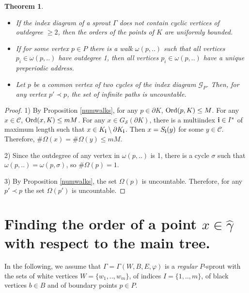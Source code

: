 \documentclass[11pt,reqno]{amsart}
\newtheorem{theorem}{Theorem}[section]
\newcommand{\hga}{{\hat\gamma}}
\newcommand{\eS}{{\mathcal S}}
\begin{document}
\begin{theorem}\label{inf_ram}
\qquad
\begin{itemize} 
\item[1)] If the index diagram of a sprout $\Gamma$ does not contain cyclic  vertices of outdegree $\ge 2$,
then the  orders of the points of $K$ are uniformly bounded.
\item[2)] If for some vertex $p \in  P $ there is a walk $\omega(p,..)$ such that all  vertices $p_i\in \omega(p,..)$ have  outdegree 1, then all  vertices $p_i\in \omega(p,..)$ have a unique preperiodic address.
\item[3)] Let $p$ be a common vertex of  two cycles  of the index diagram ${{\mathcal G}}_P$. Then, for any vertex $p'\prec p$, the set of infinite paths is uncountable.
\end{itemize}
\end{theorem}
  
\begin{proof} 
1) By Proposition \ref{numwalks},  for any $p\in {\partial} K$, ${\mathop{\rm Ord} \nolimits}(p,K)\le M$.
For any $x\in {\mathcal C}$, ${\mathop{\rm Ord} \nolimits}(x,K)\le m M$.
For any $x\in G_{\eS}({\partial} K)$, there is a multiindex ${\bf {i}}\in  I^*$ of maximum length such that  $x\in K_{\bf {i}}\setminus {\partial} K_{\bf {i}}$. Then $x=S_{\bf {i}}(y)$ for some 
$y\in{\mathcal C}$. Therefore, $\#\Omega(x)=\#\Omega(y) \le mM$. 

2) Since the outdegree of any vertex in $\omega(p,..)$ is 1, there is a cycle $\sigma$ such that $\omega(p,..)=\omega(p,\sigma)$, so $\#\Omega(p)=1$.

3) By Proposition \ref{numwalks},  the set $\Omega(p)$ is uncountable. 
Therefore, for any $p'\prec p$  the set  $\Omega(p')$ is uncountable.
\end{proof} 

\section{Finding the order of a point $x\in\hga$ with respect to the main tree.}

In the following, we  assume that $\Gamma=\Gamma(W,B,E,\varphi)$ is a {\em regular} $P$-sprout   with the sets of white vertices $W=\{w_1,..,w_m\}$, of indices $I=\{1,..,m\}$,  of black vertices $b\in B$ and of boundary points $p\in P$.\\
\end{document}
